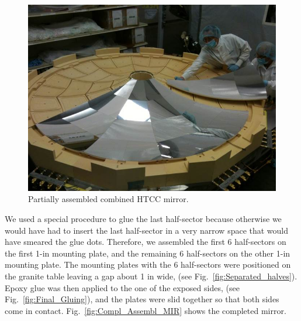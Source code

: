  \begin{figure}[ht]
    \centering
    \includegraphics[width=1.0\linewidth]{images/Partial_Assembl_MIR.jpg}
    \caption{ Partially assembled combined HTCC mirror.}
    \label{fig:Partial_Assembl_MIR}
\end{figure}


We used a special procedure to glue the last half-sector because otherwise we would have had to insert the last
half-sector in a very narrow space that would have smeared the glue dots. Therefore, we assembled the first 6
half-sectors on the first 1-in mounting plate, and the remaining 6 half-sectors on the other 1-in mounting plate.
The mounting plates with the 6 half-sectors were positioned on the granite table leaving a gap about 1 in wide,
(see Fig.~\ref{fig:Separated_halves}). Epoxy glue was then applied to the one of the exposed sides, (see
Fig.~\ref{fig:Final_Gluing}), and the plates were slid together so that both sides come in contact. Fig.~\ref{fig:Compl_Assembl_MIR} shows the completed mirror. 
 
